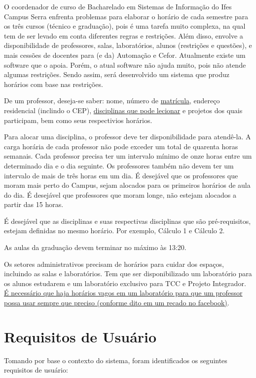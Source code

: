 \documentclass[a4paper, 12pt]{article}
\begin{document}
	O coordenador de curso de Bacharelado em Sistemas de Informação do Ifes Campus Serra enfrenta problemas para elaborar o horário de cada semestre para os três cursos (técnico e graduação), pois é uma tarefa muito complexa, na qual tem de ser levado em conta diferentes regras e restrições. Além disso, envolve a disponibilidade de professores, salas, laboratórios, alunos (restrições e questões), e mais cessões de docentes para (e da) Automação e Cefor. Atualmente existe um software que o apoia. Porém, o atual software não ajuda muito, pois não atende algumas restrições. Sendo assim, será desenvolvido um sistema que produz horários com base nas restrições.

	De um professor, deseja-se saber: nome, número de \uline{matrícula}, endereço residencial (inclindo o CEP), \uline{disciplinas que pode lecionar} e projetos dos quais participam, bem como seus respectivios horários.

	Para alocar uma disciplina, o professor deve ter disponibilidade para atendê-la. A carga horária de cada professor não pode exceder um total de quarenta horas semanais. Cada professor precisa ter um intervalo mínimo de onze horas entre um determinado dia e o dia seguinte. Os professores também não devem ter um intervalo de mais de três horas em um dia. É desejável que os professores que moram mais perto do Campus, sejam alocados para os primeiros horários de aula do dia. É desejável que professores que moram longe, não estejam alocados a partir das 15 horas.
	
	É desejável que as disciplinas e suas respectivas disciplinas que são pré-requisitos, estejam definidas no mesmo horário. Por exemplo, Cálculo 1 e Cálculo 2.
	
	As aulas da graduação devem terminar no máximo às 13:20.
	
	Os setores administrativos precisam de horários para cuidar dos espaços, incluindo as salas e laboratórios. Tem que ser disponibilizado um laboratório para os alunos estudarem e um laboratório exclusivo para TCC e Projeto Integrador. \uline{É necessário que haja horários vagos em um laboratório para que um professor possa usar sempre que preciso (conforme dito em um recado no facebook)}.
	
	
	\section{Requisitos de Usuário}
	
	\par Tomando por base o contexto do sistema, foram identificados os seguintes requisitos de usuário:
	
\end{document}
